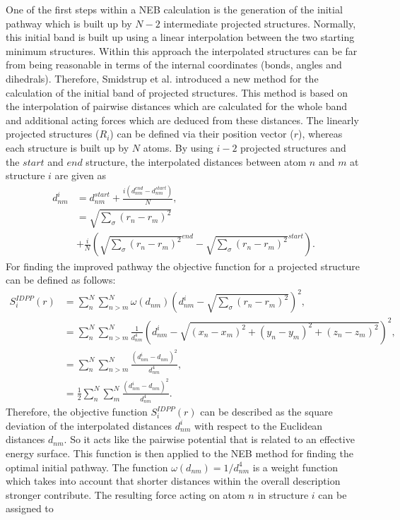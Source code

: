 \documentclass[10pt,a4paper]{article} %
\begin{document}
\begin{itemize}
	One of the first steps within a NEB calculation is the generation of the initial pathway which is built up by $N-2$ intermediate projected structures. Normally, this initial band is built up using a linear interpolation between the two starting minimum structures. Within this approach the interpolated structures can be far from being reasonable in terms of the internal coordinates (bonds, angles and dihedrals). Therefore, Smidstrup et al.\supercite{Smidstrup2014} introduced a new method for the calculation of the initial band of projected structures. This method is based on the interpolation of pairwise distances which are calculated for the whole band and additional acting forces which are deduced from these distances. The linearly projected structures ($R_{i}$) can be defined via their position vector ($r$), whereas each structure is built up by $N$ atoms. By using $i-2$ projected structures and the $start$ and $end$ structure, the interpolated distances between atom $n$ and $m$ at structure $i$	are given as
	\begin{equation}
	\begin{aligned}
	d^{i}_{nm} &= d^{start}_{nm} + \frac{i\left(d^{end}_{nm}-d^{start}_{nm}\right)}{N},\\
	&=\sqrt{\sum_{\sigma}\left(r_{n}-r_{m}\right)^2}\\
	&+\frac{i}{N}\left(\sqrt{\sum_{\sigma}\left(r_{n}-r_{m}\right)^2}^{end}-\sqrt{\sum_{\sigma}\left(r_{n}-r_{m}\right)^2}^{start}\right).	
	\end{aligned}
	\end{equation}
	For finding the improved pathway the objective function for a projected structure can be defined as follows:
	\begin{equation}
	\begin{aligned}
	S^{IDPP}_{i}(r) &=\sum^{N}_{n}\sum^{N}_{n>m}\omega (d_{nm}) \left(d^{i}_{nm}-\sqrt{\sum_{\sigma}\left(r_{n}-r_{m}\right)^2}\right)^{2},\\
	&=\sum^{N}_{n}\sum^{N}_{n>m} \frac{1}{d^{4}_{nm}} \left(d^{i}_{nm}-\sqrt{\left(x_{n}-x_{m}\right)^{2}+\left(y_{n}-y_{m}\right)^{2}+\left(z_{n}-z_{m}\right)^{2}}\right)^{2},\\
	&=\sum^{N}_{n}\sum^{N}_{n>m} \frac{\left(d^{i}_{nm}-d_{nm} \right)^{2}}{d^{4}_{nm}},\\
	&=\frac{1}{2}\sum^{N}_{n}\sum^{N}_{m} \frac{\left(d^{i}_{nm}-d_{nm} \right)^{2}}{d^{4}_{nm}}.
	\end{aligned}
	\end{equation}
	Therefore, the objective function $S^{IDPP}_{i}(r)$ can be described as the square deviation of the interpolated distances $d^{i}_{nm}$ with respect to the Euclidean distances $d_{nm}$. So it acts like the pairwise potential that is related to an effective energy surface. This function is then applied to the NEB method for finding the optimal initial pathway. The function $\omega(d_{nm})=1/d^{4}_{nm}$ is a weight function which takes into account that shorter distances within the overall description stronger contribute. The resulting force acting on atom $n$ in structure $i$ can be assigned to
	

\end{itemize}
\end{document}
